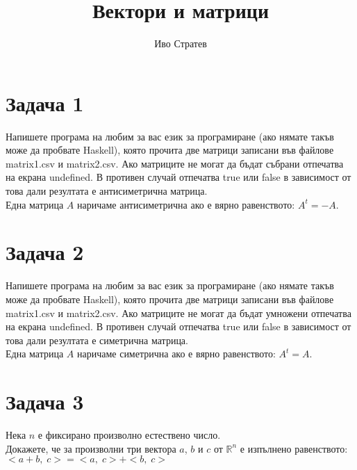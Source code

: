 \documentclass[12pt]{article}
\title{Вектори и матрици}
\author{Иво Стратев}
\newcommand{\R}{\mathbb{R}}
\begin{document}
\maketitle

\section*{Задача 1}

Напишете програма на любим за вас език за програмиране (ако нямате такъв може да пробвате Haskell),
която прочита две матрици записани във файлове matrix1.csv и matrix2.csv. Ако матриците не могат да бъдат събрани
отпечатва на екрана undefined. В противен случай отпечатва true или false в зависимост от това дали
резултата е антисиметрична матрица. \\

Една матрица $A$ наричаме антисиметрична ако е вярно равенството: $A^t = -A$.

\section*{Задача 2}

Напишете програма на любим за вас език за програмиране (ако нямате такъв може да пробвате Haskell),
която прочита две матрици записани във файлове matrix1.csv и matrix2.csv. Ако матриците не могат да бъдат умножени
отпечатва на екрана undefined. В противен случай отпечатва true или false в зависимост от това дали
резултата е симетрична матрица. \\

Една матрица $A$ наричаме симетрична ако е вярно равенството: $A^t = A$.

\section*{Задача 3}

Нека $n$ е фиксирано произволно естествено число. \\

Докажете, че за произволни три вектора $a$, $b$ и $c$ от $\R^n$ е изпълнено равенството: \\

$<a + b, \; c> = <a, \; c> + <b, \; c>$
\end{document}

